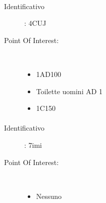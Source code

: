 \documentclass[../SperimentazioniPratiche.tex]{subfiles}
\begin{document}
			\paragraph*{}
			\label{01003}
			\begin{tcolorbox}[fonttitle=\bfseries, 
								adjusted title={\Large Beacon 01003},
								sharp corners=south,
								colback=white, 
								colframe=white!50!blue!75!black]
								
				\begin{description}
					\item[Identificativo]: 4CUJ

					\tcbline					
					
					\item[Point Of Interest:] \ \par
					\begin{itemize}
						\item 1AD100
						\item Toilette uomini AD 1
						\item 1C150
					\end{itemize}					   				
				\end{description}  				
			\end{tcolorbox}
			
			\paragraph*{}
			\label{01004}
			\begin{tcolorbox}[fonttitle=\bfseries, 
								adjusted title={\Large Beacon 01004},
								sharp corners=south,
								colback=white, 
								colframe=white!50!blue!75!black]
								
				\begin{description}
					\item[Identificativo]: 7imi

					\tcbline					
					
					\item[Point Of Interest:] \ \par
					\begin{itemize}
						\item Nessuno
					\end{itemize}					   				
				\end{description}  				
			\end{tcolorbox}
			
\end{document}

